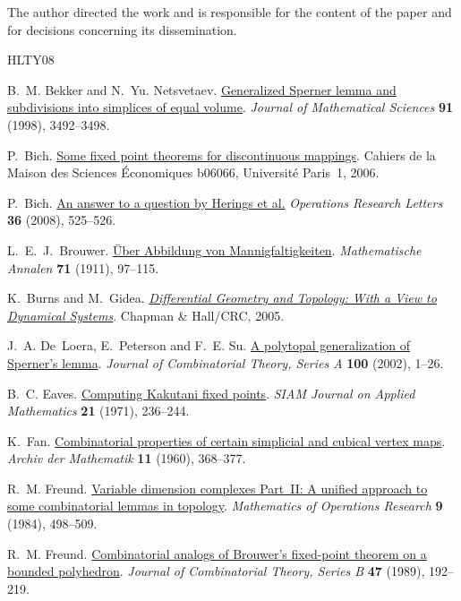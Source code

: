 \documentclass[11pt]{amsart}
\theoremstyle{definition}
\theoremstyle{remark}
\numberwithin{equation}{section}
\begin{document}
The author directed the work and is responsible for the content of the paper and for decisions concerning its dissemination.
\begin{thebibliography}{HLTY08}

B.~M. Bekker and N.~Yu. Netsvetaev.
\href{https://doi.org/10.1007/BF02434927}{Generalized Sperner lemma and subdivisions into simplices of equal volume}.
\emph{Journal of Mathematical Sciences} \textbf{91} (1998), 3492--3498.

P.~Bich.
\href{https://shs.hal.science/halshs-00119033}{Some fixed point theorems for discontinuous mappings}.
Cahiers de la Maison des Sciences \'Economiques b06066, Universit\'e Paris~1, 2006.

P.~Bich.
\href{https://doi.org/10.1016/j.orl.2008.01.014}{An answer to a question by Herings et al.}
\emph{Operations Research Letters} \textbf{36} (2008), 525--526.

L.~E.~J.~Brouwer.
\href{https://doi.org/10.1007/BF01456931}{\"Uber Abbildung von Mannigfaltigkeiten}.
\emph{Mathematische Annalen} \textbf{71} (1911), 97--115.

K.~Burns and M.~Gidea.
\href{https://doi.org/10.1201/9781420057539}{\emph{Differential Geometry and Topology: With a View to Dynamical Systems}}.
Chapman \& Hall/CRC, 2005.

J.~A. De~Loera, E.~Peterson and F.~E. Su.
\href{https://doi.org/10.1006/jcta.2002.3274}{A polytopal generalization of Sperner's lemma}.
\emph{Journal of Combinatorial Theory, Series A} \textbf{100} (2002), 1--26.

B.~C. Eaves.
\href{https://doi.org/10.1137/0121027}{Computing Kakutani fixed points}.
\emph{SIAM Journal on Applied Mathematics} \textbf{21} (1971), 236--244.

K.~Fan.
\href{https://doi.org/10.1007/BF01236961}{Combinatorial properties of certain simplicial and cubical vertex maps}.
\emph{Archiv der Mathematik} \textbf{11} (1960), 368--377.

R.~M. Freund.
\href{https://doi.org/10.1287/moor.9.4.498}{Variable dimension complexes Part~II: A unified approach to some combinatorial lemmas in topology}.
\emph{Mathematics of Operations Research} \textbf{9} (1984), 498--509.

R.~M. Freund.
\href{https://doi.org/10.1016/0095-8956(89)90020-8}{Combinatorial analogs of Brouwer's fixed-point theorem on a bounded polyhedron}.
\emph{Journal of Combinatorial Theory, Series B} \textbf{47} (1989), 192--219.


\end{thebibliography}
\end{document}
